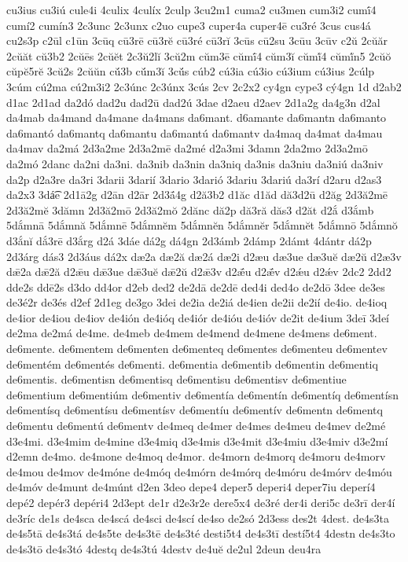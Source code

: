 {cu3ius
cu3iú
cule4i
4culix
4culíx
2culp
3cu2m1
cuma2
cu3men
cum3i2
cumī́4
cumí2
cumín3
2c3unc
2c3unx
c2uo
cupe3
cuper4a
cuper4ē
cu3ré
3cus
cus4á
cu2s3p
c2ūl
c1ūn
3cūq
cū3rē
cū3rĕ
cū3ré
cū3rĭ
3cūs
cū2su
3cūu
3cūv
c2ŭ
2cŭăr
2cŭăt
cŭ3b2
2cŭēs
2cŭĕt
2c3ŭ2lĭ
3cŭ2m
cŭm3ē
cŭmī́4
cŭm3ĭ
cŭmĭ́4
cŭmĭ́n5
2cŭŏ
cŭpĕ5rĕ
3cŭ2s
2cŭŭn
cŭ́3b
cŭ́m3ĭ
3cŭ́s
cúb2
cú3ia
cú3io
cú3ium
cú3ius
2cúlp
3cúm
cú2ma
cú2m3i2
2c3únc
2c3únx
3cús
2cv
2c2x2
cy4gn
cype3
cý4gn
1d
d2ab2
d1ac
2d1ad
da2dó
dad2u
dad2ū
dad2ú
3dae
d2aeu
d2aev
2d1a2g
da4g3n
d2al
da4mab
da4mand
da4mane
da4mans
da6mant.
d6amante
da6mantn
da6manto
da6mantó
da6mantq
da6mantu
da6mantú
da6mantv
da4maq
da4mat
da4mau
da4mav
da2má
2d3a2me
2d3a2mē
da2mé
d2a3mi
3damn
2da2mo
2d3a2mō
da2mó
2danc
da2ni
da3ni.
da3nib
da3nin
da3niq
da3nis
da3niu
da3niú
da3niv
da2p
d2a3re
da3ri
3darii
3darií
3dario
3darió
3dariu
3dariú
da3rí
d2aru
d2as3
da2x3
3dá͡e
2d1ā2g
d2ān
d2ār
2d3ā́4g
d2ă3b2
d1ăc
d1ăd
dă3d2ū
d2ăg
2d3ă2mē
2d3ă2mĕ
3dămn
2d3ă2mō
2d3ă2mŏ
2dănc
dă2p
dă3ră
dăs3
d2ăt
d2ắ
d3ắmb
5dắmnā
5dắmnă
5dắmnē
5dắmnĕm
5dắmnĕn
5dắmnĕr
5dắmnĕt
5dắmnō
5dắmnŏ
d3ắnĭ
dắ3rē
d3ắrg
d2á
3dáe
dá2g
dá4gn
2d3ámb
2dámp
2dámt
4dántr
dá2p
2d3árg
dás3
2d3áus
dá2x
dæ2a
dæ2ă
dæ2á
dæ2i
d2æu
dæ3ue
dæ3uĕ
dæ2ŭ
d2æ3v
dǣ2a
dǣ2ă
d2ǣu
dǣ3ue
dǣ3uĕ
dǣ2ŭ
d2ǣ3v
d2ǣ́u
d2ǣ́v
d2ǽu
d2ǽv
2dc2
2dd2
dde2s
ddē2s
d3do
dd4or
d2eb
ded2
de2dā
de2dē
ded4i
ded4o
de2dō
3dee
de3es
de3é2r
de3és
d2ef
2d1eg
de3go
3dei
de2ia
de2iá
de4ien
de2ii
de2ií
de4io.
de4ioq
de4ior
de4iou
de4iov
de4ión
de4ióq
de4iór
de4ióu
de4ióv
de2it
de4ium
3deī
3deí
de2ma
de2má
de4me.
de4meb
de4mem
de4mend
de4mene
de4mens
de6ment.
de6mente.
de6mentem
de6menten
de6menteq
de6mentes
de6menteu
de6mentev
de6mentém
de6mentés
de6menti.
de6mentia
de6mentib
de6mentin
de6mentiq
de6mentis.
de6mentisn
de6mentisq
de6mentisu
de6mentisv
de6mentiue
de6mentium
de6mentiúm
de6mentiv
de6mentía
de6mentín
de6mentíq
de6mentísn
de6mentísq
de6mentísu
de6mentísv
de6mentíu
de6mentív
de6mentn
de6mentq
de6mentu
de6mentú
de6mentv
de4meq
de4mer
de4mes
de4meu
de4mev
de2mé
d3e4mi.
d3e4mim
de4mine
d3e4miq
d3e4mis
d3e4mit
d3e4miu
d3e4miv
d3e2mí
d2emn
de4mo.
de4mone
de4moq
de4mor.
de4morn
de4morq
de4moru
de4morv
de4mou
de4mov
de4móne
de4móq
de4mórn
de4mórq
de4móru
de4mórv
de4móu
de4móv
de4munt
de4múnt
d2en
3deo
depe4
deper5
deperi4
deper7iu
deperí4
depé2
depér3
depéri4
2d3ept
de1r
d2e3r2e
dere5x4
de3ré
der4i
deri5c
de3rī
der4í
de3ríc
de1s
de4sca
de4scá
de4sci
de4scí
de4so
de2só
2d3ess
des2t
4dest.
de4s3ta
de4s5tā
de4s3tá
de4s5te
de4s3tē
de4s3té
desti5t4
de4s3tī
destí5t4
4destn
de4s3to
de4s3tō
de4s3tó
4destq
de4s3tú
4destv
de4uĕ
de2ul
2deun
deu4ra
}
